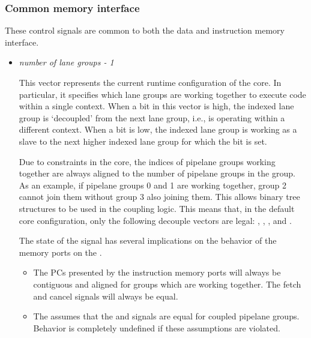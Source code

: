 
\subsubsection{Common memory interface}
\label{sec:core-ug-cfg-inst-port-cmem}

These control signals are common to both the data and instruction memory 
interface.

\begin{itemize}

\item {}\textit{number of lane groups - 1}

This vector represents the current runtime configuration of the core. In 
particular, it specifies which lane groups are working together to execute code 
within a single context. When a bit in this vector is high, the indexed lane 
group is `decoupled' from the next lane group, i.e., is operating within a 
different context. When a bit is low, the indexed lane group is working as a 
slave to the next higher indexed lane group for which the bit is set.

Due to constraints in the core, the indices of pipelane groups working together 
are always aligned to the number of pipelane groups in the group. As an example, 
if pipelane groups 0 and 1 are working together, group 2 cannot join them 
without group 3 also joining them. This allows binary tree structures to be used 
in the coupling logic. This means that, in the default core configuration, only 
the following decouple vectors are legal: , , 
,  and .

The state of the  signal has several implications on the 
behavior of the memory ports on the \rvex{}.

\begin{itemize}

\item The PCs presented by the instruction memory ports will always be 
contiguous and aligned for groups which are working together. The fetch and 
cancel signals will always be equal.

\item The \rvex{} assumes that the  and 
 signals are equal for coupled pipelane groups. 
Behavior is completely undefined if these assumptions are violated.

\end{itemize}


\end{itemize}
